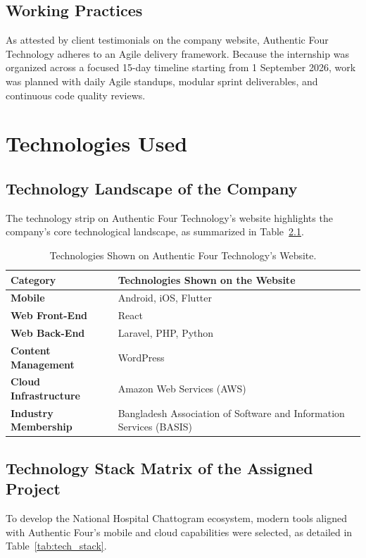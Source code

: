 \documentclass[11pt,a4paper,oneside]{report}
\begin{document}
\section{Working Practices}
As attested by client testimonials on the company website, Authentic Four Technology adheres to an Agile delivery framework. Because the internship was organized across a focused 15-day timeline starting from 1 September 2026, work was planned with daily Agile standups, modular sprint deliverables, and continuous code quality reviews.

\chapter{Technologies Used}

\section{Technology Landscape of the Company}
The technology strip on Authentic Four Technology's website highlights the company's core technological landscape, as summarized in Table~\ref{tab:company_tech_landscape}.

\begin{table}[H]
\centering
\small
\begin{tabularx}{\textwidth}{lX}
\toprule
\textbf{Category} & \textbf{Technologies Shown on the Website} \\
\midrule
\textbf{Mobile} & Android, iOS, Flutter \\
\textbf{Web Front-End} & React \\
\textbf{Web Back-End} & Laravel, PHP, Python \\
\textbf{Content Management} & WordPress \\
\textbf{Cloud Infrastructure} & Amazon Web Services (AWS) \\
\textbf{Industry Membership} & Bangladesh Association of Software and Information Services (BASIS) \\
\bottomrule
\end{tabularx}
\caption{Technologies Shown on Authentic Four Technology's Website.}
\label{tab:company_tech_landscape}
\end{table}

\section{Technology Stack Matrix of the Assigned Project}
To develop the National Hospital Chattogram ecosystem, modern tools aligned with Authentic Four's mobile and cloud capabilities were selected, as detailed in Table~\ref{tab:tech_stack}.
\end{document}
